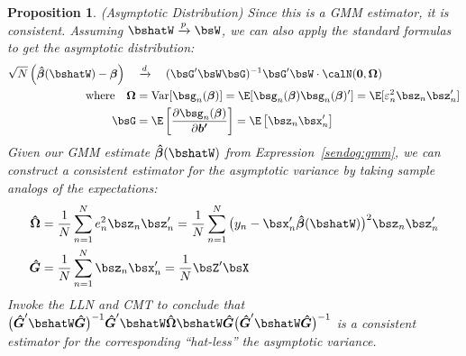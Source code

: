 \documentclass[12pt]{article}
\theoremstyle{plain}
\newtheorem{prop}[thm]{Proposition}
\theoremstyle{definition}
\theoremstyle{remark}
\newcommand{\bsvarepsilon}{\boldsymbol{\varepsilon}}
\newcommand{\bsbeta}{\boldsymbol{\beta}}
\newcommand{\bshatG}{\boldsymbol{\hat{G}}}
\newcommand{\bsOmega}{\boldsymbol{\Omega}}
\newcommand{\bshatbeta}{\boldsymbol{\hat{\beta}}}
\newcommand{\bshatOmega}{\boldsymbol{\hat{\Omega}}}
\renewcommand{\bso}{\boldsymbol{0}}
\newcommand{\bsbp}{\boldsymbol{b'}}
\newcommand{\Var}{\operatorname{Var}}
\newcommand{\pto}{\xrightarrow{p}}
\newcommand{\dto}{\xrightarrow{d}}
\newcommand{\sumnN}{\sum^N_{n=1}}
\begin{document}

\begin{prop}\emph{(Asymptotic Distribution)}
\label{prop:gmmasymptotics}
Since this is a GMM estimator, it is consistent. Assuming
$\bshatW\pto\bsW$, we can also apply the standard formulas to get the
asymptotic distribution:
\begin{align*}
  \sqrt{N}\left(\bshatbeta(\bshatW) - \bsbeta\right)
  \quad &\dto \quad
  (\bsG'\bsW\bsG)^{-1}\bsG'\bsW\cdot
  \calN(\bso,\bsOmega) \\
  \text{where}\quad
  \bsOmega &=
    \Var[\bsg_n(\bsbeta)] =
    \E[\bsg_n(\bsbeta)\bsg_n(\bsbeta)']
    = \E[\varepsilon_n^2 \bsz_n\bsz_n']
  \\
  \bsG &=
  \E\left[
    \frac{\partial \bsg_n(\bsbeta)}{\partial \bsbp}
  \right]
  =
  \E\left[
    \bsz_n\bsx_n'
  \right]
\end{align*}
Given our GMM estimate $\bshatbeta(\bshatW)$ from
Expression~\ref{sendog:gmm}, we can construct a consistent estimator for
the asymptotic variance by taking sample analogs of the expectations:
\begin{align*}
  \bshatOmega &=
  \frac{1}{N}\sumnN e_n^2\bsz_n\bsz_n'
  =
  \frac{1}{N}\sumnN \big(y_n-\bsx_n'\bshatbeta(\bshatW)\big)^2\bsz_n\bsz_n'
  \\
  \bshatG
  &=
  \frac{1}{N}\sumnN
  \bsz_n\bsx_n'
  = \frac{1}{N}\bsZ'\bsX
\end{align*}
Invoke the LLN and CMT to conclude that
$\big(\bshatG'\bshatW\bshatG\big)^{-1}
\bshatG'\bshatW\bshatOmega
\bshatW\bshatG
\big(\bshatG'\bshatW\bshatG\big)^{-1}$
is a consistent estimator for the corresponding ``hat-less'' the
asymptotic variance.
\end{prop}
\end{document}
